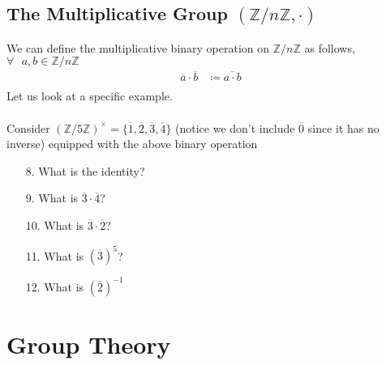 \documentclass{article}
\begin{document}
\subsection{The Multiplicative Group $(\mathbb{Z}/n\mathbb{Z}, \cdot)$}

We can define the multiplicative binary operation on $\mathbb{Z}/n\mathbb{Z}$ as follows, $\forall\text{ }a,b\in\mathbb{Z}/n\mathbb{Z}$
\begin{align*}
  \overline{a} \cdot \overline{b} &\coloneq \overline{a\cdot b}\\
\end{align*}
  Let us look at a specific example.
  \\\\Consider $(\mathbb{Z}/5\mathbb{Z})^\times = \{\overline{1}, \overline{2}, \overline{3}, \overline{4}\}$ (notice we don't include $\overline{0}$ since it has no inverse) equipped with the above binary operation
  \begin{itemize}
  \item [8.] What is the identity?
  \item [9.] What is $\overline{3} \cdot \overline{4}$?
  \item [10.] What is $\overline{3} \cdot \overline{2}$?
  \item [11.] What is $(\overline{3})^5$?
  \item [12.] What is $(\overline{2})^{-1}$
  \end{itemize}

  \section{Group Theory}
\end{document}
